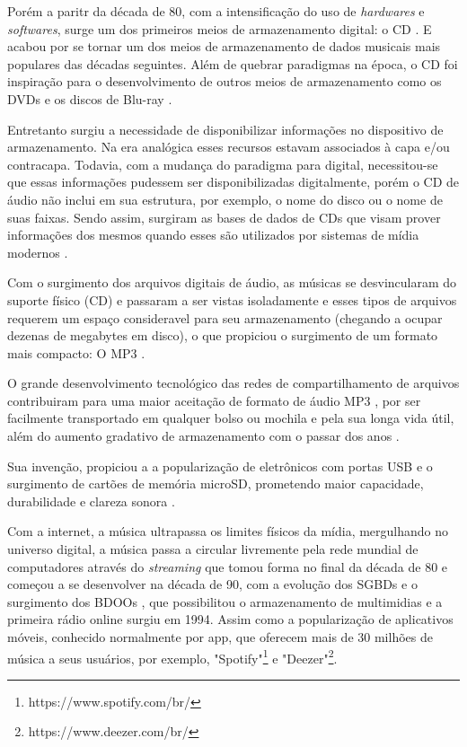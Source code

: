 Porém a paritr da década de 80, com a intensificação do uso de \textit{hardwares} e \textit{softwares}, surge um dos primeiros meios de
armazenamento digital: o CD . E acabou por se tornar um dos meios de armazenamento de dados musicais mais populares das décadas seguintes. Além de quebrar paradigmas na época, o CD foi inspiração para o desenvolvimento de outros meios de armazenamento como os DVDs e os discos de Blu-ray \cite{marchi2005}.

Entretanto surgiu a necessidade de disponibilizar informações no dispositivo de armazenamento. Na era analógica esses recursos estavam associados à capa e/ou contracapa. Todavia, com a mudança do paradigma para digital, necessitou-se que essas informações pudessem ser disponibilizadas digitalmente, porém o CD de áudio não inclui em sua estrutura, por exemplo, o nome do disco ou o nome de suas faixas. Sendo assim, surgiram as bases de dados de CDs que visam prover informações dos mesmos quando esses são utilizados por sistemas de mídia modernos \cite{andrade&crispim2008}.

Com o surgimento dos arquivos digitais de áudio, as músicas se desvincularam do suporte físico (CD) e passaram a ser vistas isoladamente e esses tipos de arquivos requerem um espaço consideravel para seu armazenamento (chegando a ocupar dezenas de megabytes em disco), o que propiciou o surgimento de um formato mais compacto: O MP3 . 

O grande desenvolvimento tecnológico das redes de compartilhamento de arquivos contribuiram para uma maior aceitação de formato de áudio MP3 \cite{andrade&crispim2008}, por ser facilmente transportado em qualquer bolso ou mochila e pela sua longa vida útil, além do aumento gradativo de armazenamento com o passar dos anos \cite{marchi2005}.

Sua invenção, propiciou a a popularização de eletrônicos com portas USB e o surgimento de cartões de memória microSD, prometendo maior capacidade, durabilidade e clareza sonora \cite{marchi2005}.

Com a internet, a música ultrapassa os limites físicos da mídia, mergulhando no universo digital, a música passa a circular livremente pela rede mundial de computadores através do \textit{streaming} que tomou forma no final da década de 80 e começou a se desenvolver na década de 90, com a evolução dos SGBDs  e o surgimento dos BDOOs  \cite{junior&segundo2008}, que possibilitou o armazenamento de multimidias e a primeira rádio online surgiu em 1994. Assim como a popularização de aplicativos móveis, conhecido normalmente por app, que oferecem mais de 30 milhões de música a seus usuários, por exemplo, "Spotify"\footnote{https://www.spotify.com/br/} e "Deezer"\footnote{https://www.deezer.com/br/}.

